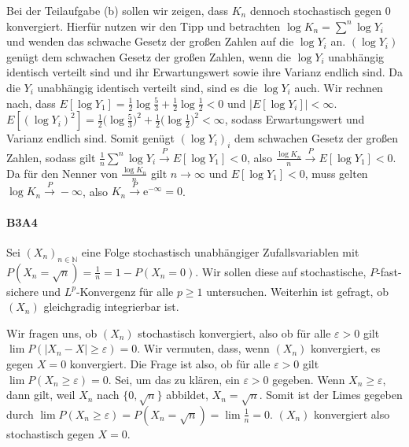 \documentclass{article}
\begin{document}
Bei der Teilaufgabe (b) sollen wir zeigen, dass $K_n$ dennoch stochastisch gegen 0 konvergiert.
Hierfür nutzen wir den Tipp und betrachten $\log K_n=\sum^n\log Y_i$ und wenden das schwache Gesetz der großen Zahlen auf die $\log Y_i$ an.
$(\log Y_i)$ genügt dem schwachen Gesetz der großen Zahlen, wenn die $\log Y_i$ unabhängig identisch verteilt sind und ihr Erwartungswert sowie ihre Varianz endlich sind.
Da die $Y_i$ unabhängig identisch verteilt sind, sind es die $\log Y_i$ auch.
Wir rechnen nach, dass $E[\log Y_1]=\frac{1}{2}\log\frac{5}{3}+\frac{1}{2}\log\frac{1}{2}<0$ und $|E[\log Y_i]|<\infty$.
$E[(\log Y_i)^2]=\frac{1}{2}\bigl(\log\frac{5}{3}\bigr)^2+\frac{1}{2}\bigl(\log\frac{1}{2}\bigr)^2<\infty$, sodass Erwartungswert und Varianz endlich sind.
Somit genügt $(\log Y_i)_i$ dem schwachen Gesetz der großen Zahlen, sodass gilt $\frac{1}{n}\sum^n\log Y_i\xrightarrow{P}E[\log Y_1]<0$, also $\frac{\log K_n}{n}\xrightarrow{P}E[\log Y_1]<0$.
Da für den Nenner von $\frac{\log K_n}{n}$ gilt $n\to\infty$ und $E[\log Y_1]<0$, muss gelten $\log K_n\xrightarrow{P}-\infty$, also $K_n\xrightarrow{P}\mathrm{e}^{-\infty}=0$.

\newpage
\paragraph{B3A4}
Sei $(X_n)_{n\in\mathbb{N}}$ eine Folge stochastisch unabhängiger Zufallsvariablen mit $P(X_n=\sqrt{n})=\frac{1}{n}=1-P(X_n=0)$.
Wir sollen diese auf stochastische, $P$-fast-sichere und $L^p$-Konvergenz für alle $p\geq1$ untersuchen.
Weiterhin ist gefragt, ob $(X_n)$ gleichgradig integrierbar ist.

Wir fragen uns, ob $(X_n)$ stochastisch konvergiert, also ob für alle $\varepsilon>0$ gilt $\lim P(|X_n-X|\geq\varepsilon)=0$.
Wir vermuten, dass, wenn $(X_n)$ konvergiert, es gegen $X=0$ konvergiert.
Die Frage ist also, ob für alle $\varepsilon>0$ gilt $\lim P(X_n\geq\varepsilon)=0$.
Sei, um das zu klären, ein $\varepsilon>0$ gegeben.
Wenn $X_n\geq\varepsilon$, dann gilt, weil $X_n$ nach $\{0,\sqrt{n}\}$ abbildet, $X_n=\sqrt{n}$.
Somit ist der Limes gegeben durch $\lim P(X_n\geq\varepsilon)=P(X_n=\sqrt{n})=\lim\frac{1}{n}=0$.
$(X_n)$ konvergiert also stochastisch gegen $X=0$.
\end{document}
